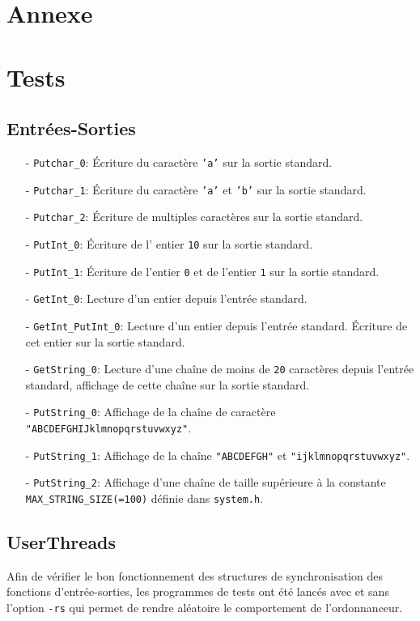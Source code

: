 \documentclass[11pt]{article}
\begin{document}
\section{Annexe}

\section{Tests}

\subsection{Entrées-Sorties}
\begin{itemize}
\item[-] \texttt{Putchar\_0}: Écriture du caractère \texttt{'a'} sur la sortie standard.
\item[-] \texttt{Putchar\_1}: Écriture du caractère \texttt{'a'} et \texttt{'b'} sur la sortie standard.
\item[-] \texttt{Putchar\_2}: Écriture de multiples caractères sur la sortie standard.
\item[-] \texttt{PutInt\_0}: Écriture de l' entier \texttt{10} sur la sortie standard.
\item[-] \texttt{PutInt\_1}: Écriture de l'entier \texttt{0} et de l'entier \texttt{1} sur la sortie standard.
\item[-] \texttt{GetInt\_0}: Lecture d'un entier depuis l'entrée standard.
\item[-] \texttt{GetInt\_PutInt\_0}:
  Lecture d'un entier depuis l'entrée standard.
  Écriture de cet entier sur la sortie standard.
\item[-] \texttt{GetString\_0}: Lecture d'une chaîne de moins de \texttt{20} caractères depuis l'entrée standard, affichage de cette chaîne sur la sortie standard.
\item[-] \texttt{PutString\_0}: Affichage de la chaîne de caractère \texttt{"ABCDEFGHIJklmnopqrstuvwxyz"}.
\item[-] \texttt{PutString\_1}: Affichage de la chaîne \texttt{"ABCDEFGH"} et \texttt{"ijklmnopqrstuvwxyz"}.
\item[-] \texttt{PutString\_2}:   Affichage d'une chaîne de taille supérieure à la
  constante \texttt{MAX\_STRING\_SIZE(=100)} définie dans \texttt{system.h}.
\end{itemize}

\subsection{UserThreads}
Afin de vérifier le bon fonctionnement des structures de synchronisation des fonctions d'entrée-sorties,
les programmes de tests ont été lancés avec et sans l'option \texttt{-rs} qui permet de rendre aléatoire le comportement de l'ordonnanceur.
\end{document}
